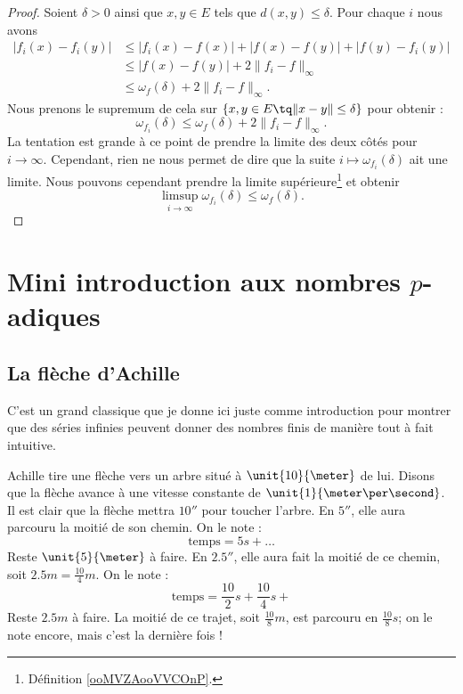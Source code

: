 \begin{proof}
	Soient \( \delta>0\) ainsi que \( x,y\in E\) tels que \( d(x,y)\leq \delta\). Pour chaque \( i\) nous avons
	\begin{subequations}
		\begin{align}
			| f_i(x)-f_i(y) | & \leq | f_i(x)-f(x) |+| f(x)-f(y) |+| f(y)-f_i(y) | \\
			                  & \leq | f(x)-f(y) |+2\| f_i-f \|_{\infty}           \\
			                  & \leq \omega_f(\delta)+2\| f_i-f \|_{\infty}.
		\end{align}
	\end{subequations}
	Nous prenons le supremum de cela sur \( \{  x,y\in E\tq \| x-y \|\leq \delta \}\) pour obtenir :
	\begin{equation}
		\omega_{f_i}(\delta)\leq \omega_f(\delta)+2\| f_i-f \|_{\infty}.
	\end{equation}
	La tentation est grande à ce point de prendre la limite des deux côtés pour \( i\to \infty\). Cependant, rien ne nous permet de dire que la suite \( i\mapsto   \omega_{f_i}(\delta)  \) ait une limite. Nous pouvons cependant prendre la limite supérieure\footnote{Définition \ref{ooMVZAooVVCOnP}.} et obtenir
	\begin{equation}
		\limsup_{i\to \infty}\omega_{f_i}(\delta)\leq \omega_f(\delta).
	\end{equation}
\end{proof}

\section{Mini introduction aux nombres \texorpdfstring{\( p\)}{p}-adiques}

\subsection{La flèche d'Achille}\label{s:un}

C'est un grand classique que je donne ici juste comme introduction pour montrer que des séries infinies peuvent donner des nombres finis de manière tout à fait intuitive.

Achille tire une flèche vers un arbre situé à \( \unit{10}{\meter}\) de lui. Disons que la flèche avance à une vitesse constante de \( \unit{1}{\meter\per\second}\). Il est clair que la flèche mettra \( \unit{10}{\second}\) pour toucher l'arbre. En \( \unit{5}{\second}\), elle aura parcouru la moitié de son chemin. On le note :
\[
	\text{temps}=5s+\ldots
\]
Reste \( \unit{5}{\meter}\) à faire. En \( \unit{2.5}{\second}\), elle aura fait la moitié de ce chemin, soit \( 2.5m=\frac{10}{4}m\). On le note :
\[
	\text{temps}=\frac{10}{2}s+\frac{10}{4}s+
\]
Reste \( 2.5m\) à faire. La moitié de ce trajet, soit \( \frac{10}{8}m\), est parcouru en \( \frac{10}{8}s\); on le note encore, mais c'est la dernière fois !

